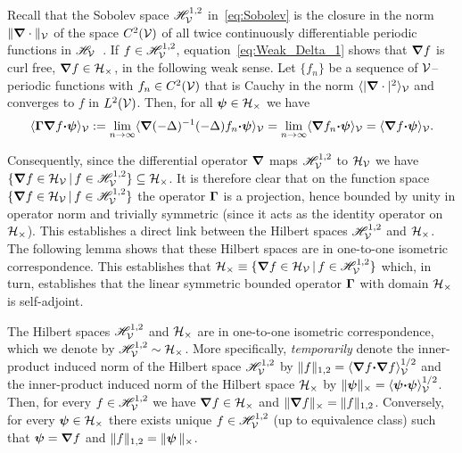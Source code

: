 \documentclass[amsa]{ipart}
\begin{document}
Recall that the Sobolev 
space $\mathscr{H}^{1,2}_{\mathcal{V}}$ in~\eqref{eq:Sobolev} is the closure in the
norm $\|\mbox{\boldmath${\nabla}$}\cdot\|_{\mathcal{V}}$ of the space $C^2(\mathcal{V})$ of all twice continuously
differentiable periodic functions in
$\mathscr{H}_{\mathcal{V}}$~\cite{Bhattacharya:AAP:1999:951}. 
If $f\in\mathscr{H}^{1,2}_{\mathcal{V}}$, equation~\eqref{eq:Weak_Delta_1} shows that
$\mbox{\boldmath${\nabla}$} f$  is curl free, $\mbox{\boldmath${\nabla}$} f\in\mathcal{H}_\times$,  in the 
following weak sense.  Let $\{ f_n\}$ be a sequence of $\mathcal{V}$--periodic
functions with $f_n\in C^2(\mathcal{V})$ that is Cauchy in the norm
$\langle|\mbox{\boldmath${\nabla}$}\cdot|^2\rangle_{\mathcal{V}}$ and converges to  $f$ in $L^2(\mathcal{V})$. Then, for all
$\mbox{\boldmath${\psi}$}\in\mathcal{H}_\times$ we have
%
\begin{align}\label{eq:Gamma_Proj_H12}
  \langle\bGamma\bnabla f\bcdot\bpsi\rangle_{\Vc}
  :=\lim_{n\to\infty}\langle\bnabla(-\Delta)^{-1}(-\Delta)f_n\bcdot\bpsi\rangle_{\Vc}
  =\lim_{n\to\infty}\langle\bnabla f_n\bcdot\bpsi\rangle_{\Vc}
  =\langle\bnabla f\bcdot\bpsi\rangle_{\Vc}.
\end{align}
%


Consequently, since the differential operator $\mbox{\boldmath${\nabla}$}$ maps
$\mathscr{H}^{1,2}_{\mathcal{V}}$ to $\mathcal{H}_{\mathcal{V}}$ we have $\{\mbox{\boldmath${\nabla}$} f\in\mathcal{H}_{\mathcal{V}} \,|\,
f\in\mathscr{H}^{1,2}_{\mathcal{V}}\}\subseteq\mathcal{H}_\times$.  
It is therefore clear that on the function space
$\{\mbox{\boldmath${\nabla}$} f\in\mathcal{H}_{\mathcal{V}} \,|\, f\in\mathscr{H}^{1,2}_{\mathcal{V}}\}$ the operator
$\mbox{\boldmath${\Gamma}$}$ is a projection, hence bounded by unity in operator
norm and trivially symmetric (since it acts as the identity operator
on $\mathcal{H}_\times$). This establishes a direct link between the Hilbert spaces
$\mathscr{H}^{1,2}_{\mathcal{V}}$ and $\mathcal{H}_\times$. The following lemma shows that these
Hilbert spaces are 
in one-to-one isometric correspondence. This establishes that
$\mathcal{H}_\times\equiv\{\mbox{\boldmath${\nabla}$} f\in\mathcal{H}_{\mathcal{V}} \,|\, f\in\mathscr{H}^{1,2}_{\mathcal{V}}\}$ which, in turn,
establishes that the linear symmetric bounded operator $\mbox{\boldmath${\Gamma}$}$ with
domain $\mathcal{H}_\times$ is self-adjoint.    


%
\begin{lemma}\label{lem:Isometry_Fs_Fc}
%  
  The Hilbert spaces $\mathscr{H}^{1,2}_{\mathcal{V}}$ and $\mathcal{H}_\times$ are in one-to-one
  isometric correspondence, which we denote by
  $\mathscr{H}^{1,2}_{\mathcal{V}}\sim\mathcal{H}_\times$. More specifically, \emph{temporarily} denote the
  inner-product induced norm of the Hilbert space $\mathscr{H}^{1,2}_{\mathcal{V}}$
  by $\|f\|_{1,2}=\langle\mbox{\boldmath${\nabla}$} f\mbox{\boldmath${\cdot}$}\mbox{\boldmath${\nabla}$} f\rangle_{\mathcal{V}}^{1/2}$ and the
  inner-product induced norm of the Hilbert space $\mathcal{H}_\times$
  by $\|\mbox{\boldmath${\psi}$}\|_\times=\langle\mbox{\boldmath${\psi}$}\mbox{\boldmath${\cdot}$}\mbox{\boldmath${\psi}$}\rangle_{\mathcal{V}}^{1/2}$. Then, for
  every $f\in\mathscr{H}^{1,2}_{\mathcal{V}}$ we have $\mbox{\boldmath${\nabla}$} f\in\mathcal{H}_\times$ and $\|\mbox{\boldmath${\nabla}$}
  f\|_\times=\|f\|_{1,2}$. Conversely, for every $\boldsymbol{\psi}\in\mathcal{H}_\times$ there exists
  unique $f\in\mathscr{H}^{1,2}_{\mathcal{V}}$ (up to equivalence class) such that
  $\boldsymbol{\psi}=\mbox{\boldmath${\nabla}$} f$ and $\|f\|_{1,2}=\|\boldsymbol{\psi}\,\|_\times$. 
%  
\end{lemma}
%
\end{document}
